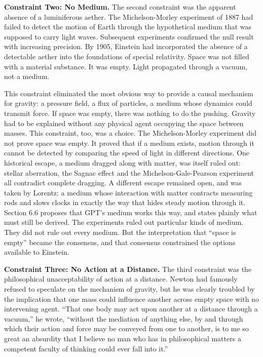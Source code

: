 \documentclass[11pt]{article}
\begin{document}
\textbf{Constraint Two: No Medium.} The second constraint was the apparent absence of a luminiferous aether. The Michelson-Morley experiment of 1887 had failed to detect the motion of Earth through the hypothetical medium that was supposed to carry light waves. Subsequent experiments confirmed the null result with increasing precision. By 1905, Einstein had incorporated the absence of a detectable aether into the foundations of special relativity. Space was not filled with a material substance. It was empty. Light propagated through a vacuum, not a medium.

This constraint eliminated the most obvious way to provide a causal mechanism for gravity: a pressure field, a flux of particles, a medium whose dynamics could transmit force. If space was empty, there was nothing to do the pushing. Gravity had to be explained without any physical agent occupying the space between masses. This constraint, too, was a choice. The Michelson-Morley experiment did not prove space was empty. It proved that if a medium exists, motion through it cannot be detected by comparing the speed of light in different directions. One historical escape, a medium dragged along with matter, was itself ruled out: stellar aberration, the Sagnac effect and the Michelson-Gale-Pearson experiment all contradict complete dragging. A different escape remained open, and was taken by Lorentz: a medium whose interaction with matter contracts measuring rods and slows clocks in exactly the way that hides steady motion through it. Section 6.6 proposes that GPT's medium works this way, and states plainly what must still be derived. The experiments ruled out particular kinds of medium. They did not rule out every medium. But the interpretation that ``space is empty'' became the consensus, and that consensus constrained the options available to Einstein.

\textbf{Constraint Three: No Action at a Distance.} The third constraint was the philosophical unacceptability of action at a distance. Newton had famously refused to speculate on the mechanism of gravity, but he was clearly troubled by the implication that one mass could influence another across empty space with no intervening agent. ``That one body may act upon another at a distance through a vacuum,'' he wrote, ``without the mediation of anything else, by and through which their action and force may be conveyed from one to another, is to me so great an absurdity that I believe no man who has in philosophical matters a competent faculty of thinking could ever fall into it.''
\end{document}
